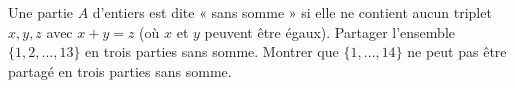 Une partie $A$ d'entiers est dite « sans somme » si elle ne contient aucun triplet $x, y, z$ avec $x + y = z$ (où $x$ et $y$ peuvent être égaux). Partager l'ensemble $\{1, 2, \ldots, 13\}$ en trois parties sans somme. Montrer que $\{1, \ldots, 14\}$ ne peut pas être partagé en trois parties sans somme.
